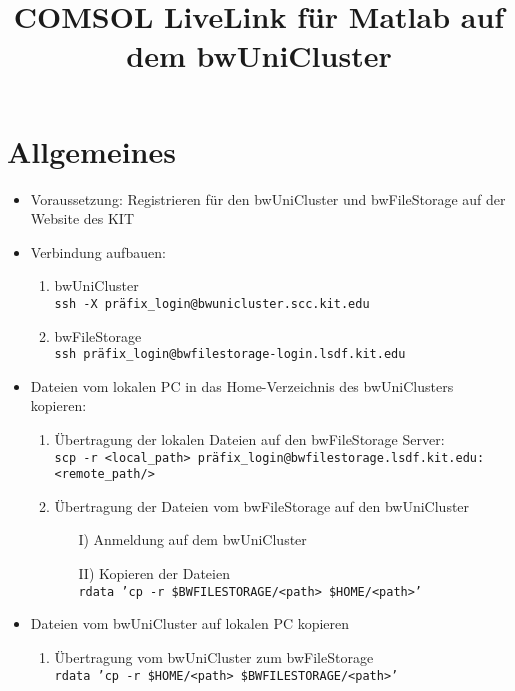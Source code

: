 \documentclass[12pt]{scrartcl}%
\theoremstyle{nonumberplain}
\begin{document}
\author{}
\title{COMSOL LiveLink für Matlab auf dem bwUniCluster}
\date{} %

\maketitle %

\section{Allgemeines}

\begin{itemize}
\item Voraussetzung: Registrieren für den bwUniCluster und bwFileStorage auf der Website des KIT 
\item Verbindung aufbauen:
\begin{enumerate}
\item bwUniCluster  \\ \texttt{ssh -X präfix\_login@bwunicluster.scc.kit.edu}
\item bwFileStorage \\ \texttt{ssh präfix\_login@bwfilestorage-login.lsdf.kit.edu}
\end{enumerate}
\item Dateien vom lokalen PC in das Home-Verzeichnis des bwUniClusters kopieren:
\begin{enumerate}
\item Übertragung der lokalen Dateien auf den bwFileStorage Server: \\ \texttt{scp -r <local\_path> präfix\_login@bwfilestorage.lsdf.kit.edu:<remote\_path/>}
\item Übertragung der Dateien vom bwFileStorage auf den bwUniCluster
\begin{enumerate}
\item[I)] Anmeldung auf dem bwUniCluster
\item[II)] Kopieren der Dateien \\ \texttt{rdata 'cp -r \$BWFILESTORAGE/<path> \$HOME/<path>'}
\end{enumerate}
\end{enumerate}
\item Dateien vom bwUniCluster auf lokalen PC kopieren
\begin{enumerate}
\item Übertragung vom bwUniCluster zum bwFileStorage \\ \texttt{rdata 'cp -r \$HOME/<path> \$BWFILESTORAGE/<path>'}

\end{enumerate}
\end{itemize}
\end{document}
